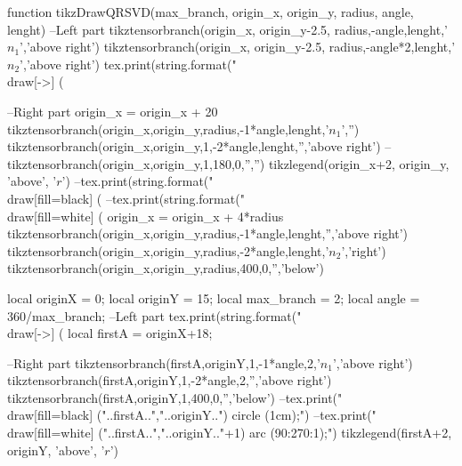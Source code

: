 \begin{luacode*}

function tikzDrawQRSVD(max_branch, origin_x, origin_y, radius, angle, lenght)
  --Left part
  tikztensorbranch(origin_x, origin_y-2.5, radius,-angle,lenght,'$n_{1}$','above right')
        tikztensorbranch(origin_x, origin_y-2.5, radius,-angle*2,lenght,'$n_{2}$','above right')
        tex.print(string.format("\\draw[->] (%
  
      --Right part
        origin_x = origin_x + 20
        tikztensorbranch(origin_x,origin_y,radius,-1*angle,lenght,'$n_{1}$','')
        tikztensorbranch(origin_x,origin_y,1,-2*angle,lenght,'','above right')
        --tikztensorbranch(origin_x,origin_y,1,180,0,'','')
        tikzlegend(origin_x+2, origin_y, 'above', '$r$')
        --tex.print(string.format("\\draw[fill=black] (%
        --tex.print(string.format("\\draw[fill=white] (%
        origin_x = origin_x + 4*radius
        tikztensorbranch(origin_x,origin_y,radius,-1*angle,lenght,'','above right')
        tikztensorbranch(origin_x,origin_y,radius,-2*angle,lenght,'$n_{2}$','right')
        tikztensorbranch(origin_x,origin_y,radius,400,0,'','below')

        local originX = 0;
        local originY = 15;
        local max_branch = 2;
        local angle = 360/max_branch;    
    --Left part
          tex.print(string.format("\\draw[->] (%
          local firstA = originX+18;
    
          --Right part
          tikztensorbranch(firstA,originY,1,-1*angle,2,'$n_{1}$','above right')
          tikztensorbranch(firstA,originY,1,-2*angle,2,'','above right')
          tikztensorbranch(firstA,originY,1,400,0,'','below')
          --tex.print("\\draw[fill=black] ("..firstA..","..originY..") circle (1cm);")
          --tex.print("\\draw[fill=white] ("..firstA..","..originY.."+1) arc (90:270:1);")
          tikzlegend(firstA+2, originY, 'above', '$r$')


\end{luacode*}
